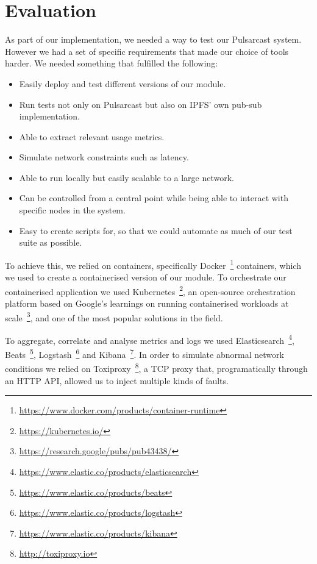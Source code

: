 
\section{Evaluation}
\label{section:evaluation}

As part of our implementation, we needed a way to test our Pulsarcast system.
However we had a set of specific requirements that made our choice of tools
harder. We needed something that fulfilled the following:

\begin{itemize}
  \item Easily deploy and test different versions of our module.
  \item Run tests not only on Pulsarcast but also on IPFS' own pub-sub
    implementation.
  \item Able to extract relevant usage metrics.
  \item Simulate network constraints such as latency.
  \item Able to run locally but easily scalable to a large network.
  \item Can be controlled from a central point while being able to interact
    with specific nodes in the system.
  \item Easy to create scripts for, so that we could automate as much of our
    test suite as possible.
\end{itemize}

To achieve this, we relied on containers, specifically
Docker~\footnote{\url{https://www.docker.com/products/container-runtime}}
containers, which we used to create a containerised version of our module. To
orchestrate our containerised application we used
Kubernetes~\footnote{\url{https://kubernetes.io/}}, an open-source
orchestration platform based on Google's learnings on running containerised
workloads at scale~\footnote{\url{https://research.google/pubs/pub43438/}}, and
one of the most popular solutions in the field.

To aggregate, correlate and analyse metrics and logs we used
Elasticsearch~\footnote{\url{https://www.elastic.co/products/elasticsearch}},
Beats~\footnote{\url{https://www.elastic.co/products/beats}},
Logstash~\footnote{\url{https://www.elastic.co/products/logstash}} and
Kibana~\footnote{\url{https://www.elastic.co/products/kibana}}. In order to
simulate abnormal network conditions we relied on
Toxiproxy~\footnote{\url{http://toxiproxy.io}}, a TCP proxy that,
programatically through an HTTP API, allowed us to inject multiple kinds of
faults.

